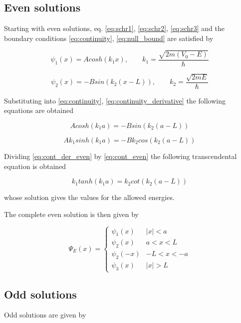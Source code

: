 \documentclass{article}
\begin{document}
\subsection{Even solutions}
Starting with even solutions, eq. \eqref{eq:schr1}, \eqref{eq:schr2}, \eqref{eq:schr3} and the boundary conditions \eqref{eq:continuity}, \eqref{eq:null_bound} are satisfied by

\begin{equation}
\psi_{1}(x) = A cosh(k_{1} x), \qquad k_{1} = \frac{\sqrt{2m(V_{0} - E)}}{\hbar}
\end{equation}

\begin{equation}
\psi_{2}(x) = - B sin(k_{2}(x-L)), \qquad k_{2} = \frac{\sqrt{2mE}}{\hbar}
\end{equation}

Substituting into \eqref{eq:continuity}, \eqref{eq:continuity_derivative} the following equations are obtained

\begin{equation}
\label{eq:cont_even}
A cosh(k_{1}a) =  - B sin(k_{2}(a-L))
\end{equation}

\begin{equation}
\label{eq:cont_der_even}
A k_{1} sinh(k_{1}a) = - B k_{2} cos(k_{2}(a-L))
\end{equation}

Dividing \eqref{eq:cont_der_even} by \eqref{eq:cont_even} the following transcendental equation is obtained

\begin{equation}
\label{eq:trans_even}
k_{1} tanh(k_{1}a) = k_{2} cot(k_{2}(a-L))
\end{equation}

whose solution gives the values for the allowed energies.

The complete even solution is then given by

\begin{equation}
\Psi_{E}(x) = 
  \begin{cases} 
      \psi_{1}(x) & \left|x\right| < a \\
      \psi_{2}(x) & a < x < L \\
      \psi_{2}(-x) & -L < x < -a \\
      \psi_{3}(x) & \left|x\right| > L
   \end{cases}
\end{equation}

\subsection{Odd solutions}
Odd solutions are given by
\end{document}
